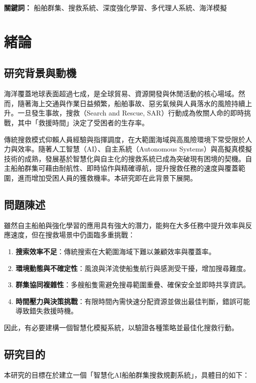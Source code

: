 \documentclass[12pt,a4paper]{article}
\begin{document}
\centerline{\textbf{關鍵詞：} 船舶群集、搜救系統、深度強化學習、多代理人系統、海洋模擬}

\newpage

\tableofcontents
\newpage

\section{緒論}

\subsection{研究背景與動機}
海洋覆蓋地球表面超過七成，是全球貿易、資源開發與休閒活動的核心場域。然而，隨著海上交通與作業日益頻繁，船舶事故、惡劣氣候與人員落水的風險持續上升。一旦發生事故，搜救（Search and Rescue, SAR）行動成為攸關人命的即時挑戰，其中「救援時間」決定了受困者的生存率\cite{NOAA}。

傳統搜救模式仰賴人員經驗與指揮調度，在大範圍海域與高風險環境下常受限於人力與效率。隨著人工智慧（AI）、自主系統（Autonomous Systems）與高擬真模擬技術的成熟，發展基於智慧化與自主化的搜救系統已成為突破現有困境的契機。自主船舶群集可藉由耐航性、即時協作與精確導航，提升搜救任務的速度與覆蓋範圍，進而增加受困人員的獲救機率\cite{GroupMobile}。本研究即在此背景下展開。

\subsection{問題陳述}
雖然自主船舶與強化學習的應用具有強大的潛力，能夠在大多任務中提升效率與反應速度，但在搜救場景中仍面臨多重挑戰\cite{KilicChallenge}\cite{KilicRL}\cite{NOAA}：

\begin{enumerate}
\item \textbf{搜索效率不足}：傳統搜索在大範圍海域下難以兼顧效率與覆蓋率。
\item \textbf{環境動態與不確定性}：風浪與洋流使船隻航行與感測受干擾，增加搜尋難度\cite{IAMSAR2008}。
\item \textbf{群集協同複雜性}：多艘船隻需避免搜尋範圍重疊、確保安全並即時共享資訊\cite{IAMSAR2008}。
\item \textbf{時間壓力與決策挑戰}：有限時間內需快速分配資源並做出最佳判斷，錯誤可能導致錯失救援時機。
\end{enumerate}

因此，有必要建構一個智慧化模擬系統，以驗證各種策略並最佳化搜救行動。

\subsection{研究目的}
本研究的目標在於建立一個「智慧化AI船舶群集搜救規劃系統」，具體目的如下：
\end{document}
